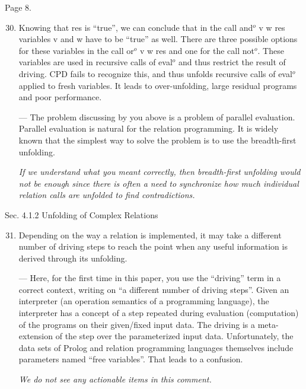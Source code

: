 Page 8.

\begin{enumerate}
  \setcounter{enumi}{29}
  \item {
  Knowing that res is ``true'', we can conclude that in the call and$^o$ v w res variables v and w have to be ``true'' as well. There are three possible options for these variables in the call or$^o$ v w res and one for the call not$^o$. These variables are used in recursive calls of eval$^o$ and thus restrict the result of driving. CPD fails to recognize this, and thus unfolds recursive calls of eval$^o$ applied to fresh variables. It leads to over-unfolding, large residual programs and poor performance.

  --- The problem discussing by you above is a problem of parallel evaluation. Parallel evaluation is natural for the relation programming. It is widely known that the simplest way to solve the problem is to use the breadth-first unfolding.

  \emph{If we understand what you meant correctly, then breadth-first unfolding would not be enough since there is often a need to synchronize how much individual relation calls are unfolded to find contradictions. }
  }

\end{enumerate}

Sec. 4.1.2 Unfolding of Complex Relations

\begin{enumerate}
  \setcounter{enumi}{30}
  \item Depending on the way a relation is implemented, it may take a different number of driving steps to reach the point when any useful information is derived through its unfolding.

  --- Here, for the first time in this paper, you use the ``driving'' term in a correct context, writing on ``a different number of driving steps''. Given an interpreter (an operation semantics of a programming language), the interpreter has a concept of a step repeated during evaluation (computation) of the programs on their given/fixed input data. The driving is a meta-extension of the step over the parameterized input data. Unfortunately, the data sets of Prolog and relation programming languages themselves include parameters named ``free variables''. That leads to a confusion.

  \emph{We do not see any actionable items in this comment.}

\end{enumerate}

